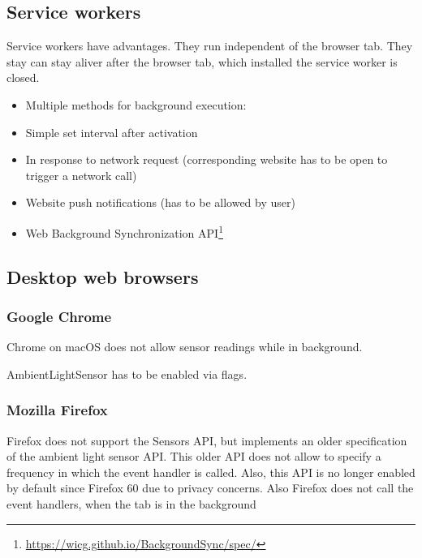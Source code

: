 \documentclass[article,type=bsc,colorback,accentcolor=tud9c]{tudthesis}
\begin{document}
  \subsection{Service workers}

  Service workers have advantages. They run independent of the browser tab. They stay can stay aliver after the browser tab, which installed the service worker is closed.

  \begin{itemize}   
  \item Multiple methods for background execution:

  \item Simple set interval after activation

  \item In response to network request (corresponding website has to be open to trigger a network call)

  \item Website push notifications (has to be allowed by user)

  \item Web Background Synchronization API\footnote{\url{https://wicg.github.io/BackgroundSync/spec/}}
  \end{itemize}

  
  \newpage

  
  \subsection{Desktop web browsers}

  \subsubsection{Google Chrome}

  Chrome on macOS does not allow sensor readings while in background.

  AmbientLightSensor has to be enabled via flags.
  
  \subsubsection{Mozilla Firefox}

  Firefox does not support the Sensors API, but implements an older specification of the ambient light sensor API. This older API does not allow to specify a frequency in which the event handler is called. Also, this API is no longer enabled by default since Firefox 60 due to privacy concerns. Also Firefox does not call the event handlers, when the tab is in the background
\end{document}
